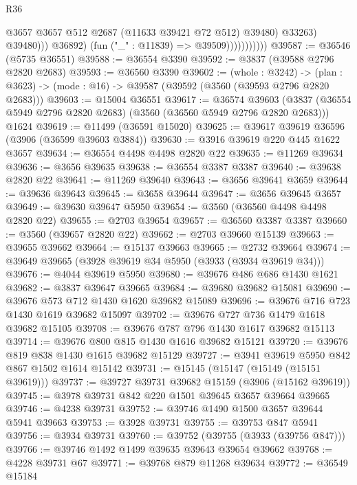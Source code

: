\begin{lexlean}{R36}
\begin{coremodule}
                                    @3657
                                    @3657
                                    @512
                                    @2687
                                    (@11633 @39421 @72 @512)
                                    @39480)
                                  @33263)
                                @39480)))
                          @36892)
                        (fun ("_" : @11839) => @39509)))))))))))
@39587 := @36546 (@5735 @36551)
@39588 := @36554 @3390
@39592 := @3837 (@39588 @2796 @2820 @2683)
@39593 := @36560 @3390
@39602 := (whole : @3242) ->
  (plan : @3623) -> (mode : @16) -> @39587 (@39592 (@3560 (@39593 @2796 @2820 @2683)))
@39603 := @15004 @36551
@39617 := @36574
    @39603
    (@3837 (@36554 @5949 @2796 @2820 @2683) (@3560 (@36560 @5949 @2796 @2820 @2683)))
    @1624
@39619 := @11499 (@36591 @15020)
@39625 := @39617 @39619 @36596 (@3906 (@36599 @39603 @3884))
@39630 := @3916 @39619 @220 @445 @1622 @3657
@39634 := @36554 @4498 @4498 @2820 @22
@39635 := @11269 @39634
@39636 := @3656 @39635
@39638 := @36554 @3387 @3387
@39640 := @39638 @2820 @22
@39641 := @11269 @39640
@39643 := @3656 @39641 @3659
@39644 := @39636 @39643
@39645 := @3658 @39644
@39647 := @3656 @39645 @3657
@39649 := @39630 @39647 @5950
@39654 := @3560 (@36560 @4498 @4498 @2820 @22)
@39655 := @2703 @39654
@39657 := @36560 @3387 @3387
@39660 := @3560 (@39657 @2820 @22)
@39662 := @2703 @39660 @15139
@39663 := @39655 @39662
@39664 := @15137 @39663
@39665 := @2732 @39664
@39674 := @39649 @39665 (@3928 @39619 @34 @5950 (@3933 (@3934 @39619 @34)))
@39676 := @4044 @39619 @5950
@39680 := @39676 @486 @686 @1430 @1621
@39682 := @3837 @39647 @39665
@39684 := @39680 @39682 @15081
@39690 := @39676 @573 @712 @1430 @1620 @39682 @15089
@39696 := @39676 @716 @723 @1430 @1619 @39682 @15097
@39702 := @39676 @727 @736 @1479 @1618 @39682 @15105
@39708 := @39676 @787 @796 @1430 @1617 @39682 @15113
@39714 := @39676 @800 @815 @1430 @1616 @39682 @15121
@39720 := @39676 @819 @838 @1430 @1615 @39682 @15129
@39727 := @3941 @39619 @5950 @842 @867 @1502 @1614 @15142
@39731 := @15145 (@15147 (@15149 (@15151 @39619)))
@39737 := @39727 @39731 @39682 @15159 (@3906 (@15162 @39619))
@39745 := @3978 @39731 @842 @220 @1501 @39645 @3657 @39664 @39665
@39746 := @4238 @39731
@39752 := @39746 @1490 @1500 @3657 @39644 @5941 @39663
@39753 := @3928 @39731
@39755 := @39753 @847 @5941
@39756 := @3934 @39731
@39760 := @39752 (@39755 (@3933 (@39756 @847)))
@39766 := @39746 @1492 @1499 @39635 @39643 @39654 @39662
@39768 := @4228 @39731 @67
@39771 := @39768 @879 @11268 @39634
@39772 := @36549 @15184

\end{coremodule}
\end{lexlean}
